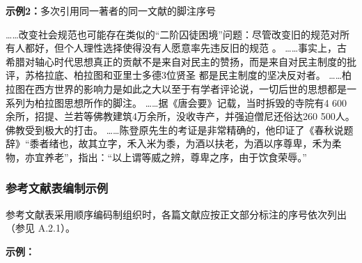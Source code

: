 \documentclass{article}
\begin{document}
\begin{refsection}
\textbf{示例2：}多次引用同一著者的同一文献的脚注序号

……改变社会规范也可能存在类似的“二阶囚徒困境”问题：尽管改变旧的规范对所有人都好，但个人理性选择使得没有人愿意率先违反旧的规范
。
……事实上，古希腊对轴心时代思想真正的贡献不是来自对民主的赞扬，而是来自对民主制度的批评，苏格拉底、柏拉图和亚里士多德3位贤圣
都是民主制度的坚决反对者。
……柏拉图在西方世界的影响力是如此之大以至于有学者评论说，一切后世的思想都是一系列为柏拉图思想所作的脚注。
……据《唐会要》记载，当时拆毁的寺院有4 600余所，招提、兰若等佛教建筑4万余所，没收寺产，并强迫僧尼还俗达260 500人。
佛教受到极大的打击。
……陈登原先生的考证是非常精确的，他印证了《春秋说题辞》“黍者绪也，故其立字，禾入米为黍，为酒以扶老，为酒以序尊卑，禾为柔物，亦宜养老”，指出：“以上谓等威之辨，尊卑之序，由于饮食荣辱。”
\end{refsection}

\subsubsection{参考文献表编制示例}

参考文献表采用顺序编码制组织时，各篇文献应按正文部分标注的序号依次列出（参见 A.2.1）。

\begin{refsection}
\textbf{示例：}

\nocite{Baker1995--,Chernik1982--,尼葛洛庞帝1996--,汪冰1997-16-16,杨宗英1996-24-29,Dowler1995-5-26}

\printbibliography[heading=none,env=indentegenv]
\end{refsection}
\end{document}

